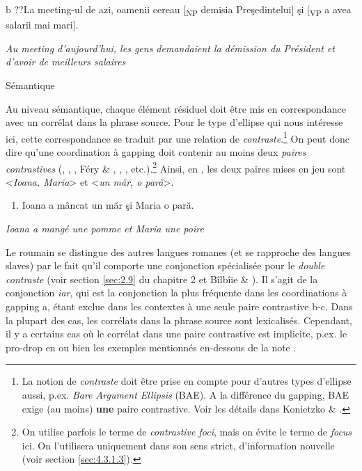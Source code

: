   b  ??La meeting-ul de azi, oamenii cereau [\textsubscript{NP} demisia Preşedintelui] şi [\textsubscript{VP} a avea salarii mai mari].

{\itshape
Au meeting d'aujourd'hui, les gens demandaient la démission du Président et d'avoir de meilleurs salaires} 

\label{bkm:Ref289107440}Sémantique

Au niveau sémantique, chaque élément résiduel doit être mis en correspondance avec un corrélat dans la phrase source. Pour le type d'ellipse qui nous intéresse ici, cette correspondance se traduit par une relation de \textit{contraste}.\footnote{La notion de \textit{contraste} doit être prise en compte pour d'autres types d'ellipse aussi, p.ex. \textit{Bare Argument Ellipsis} (BAE). A la différence du gapping, BAE exige (au moins) \textbf{une} paire contrastive. Voir les détails dans Konietzko \& \citet{Winkler2010}. }  On peut donc dire qu'une coordination à gapping doit contenir au moins deux \textit{paires contrastives} (\citet{Kuno1976}, \citet{Sag1976}, \citet{Hartmann2000}, Féry \& \citet{Hartmann2005}, \citet{Winkler2005}, \citet{Repp2009}, etc.).\footnote{On utilise parfois le terme de \textit{contrastive foci}, mais on évite le terme de \textit{focus} ici. On l'utilisera uniquement dans son sens strict, d'information nouvelle (voir section \ref{sec:4.3.1.3}).} Ainsi, en , les deux paires mises en jeu sont {\textless}\textit{Ioana, Maria}{\textgreater} et {\textless}\textit{un măr, o pară}{\textgreater}.


\begin{enumerate}
\item \label{bkm:Ref299640651}Ioana a mâncat un măr şi Maria o pară.


\end{enumerate}
\textit{  Ioana a mangé une pomme et Maria une poire }  

Le roumain se distingue des autres langues romanes (et se rapproche des langues slaves) par le fait qu'il comporte une conjonction spécialisée pour le \textit{double contraste} (voir section \ref{sec:2.9} du chapitre 2 et Bîlbîie \& \citet{Winterstein2011}). Il s'agit de la conjonction \textit{iar}, qui est la conjonction la plus fréquente dans les coordinations à gapping a, étant exclue dans les contextes à une seule paire contrastive b-c. Dans la plupart des cas, les corrélats dans la phrase source sont lexicalisés. Cependant, il y a certains cas où le corrélat dans une paire contrastive est implicite, p.ex. le pro-drop en  ou bien les exemples mentionnés en-dessous de la note \pageref{fnt:ftn0}. 


